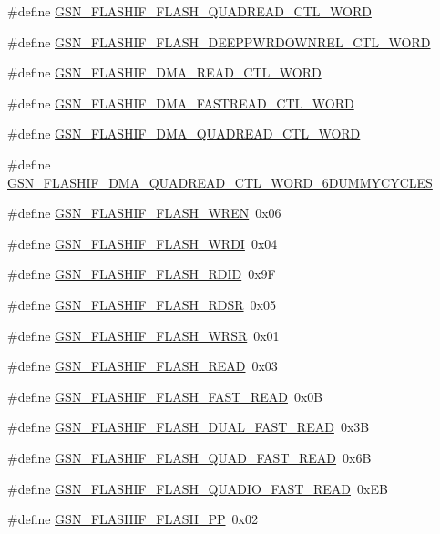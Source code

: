 \begin{DoxyCompactItemize}
\#define \hyperlink{a00501_a1064f47413205b627537f5b62089f921}{GSN\_\-FLASHIF\_\-FLASH\_\-QUADREAD\_\-CTL\_\-WORD}
\item 
\#define \hyperlink{a00501_a82c4245515ddf32d66c496d5c01545c8}{GSN\_\-FLASHIF\_\-FLASH\_\-DEEPPWRDOWNREL\_\-CTL\_\-WORD}
\item 
\#define \hyperlink{a00501_a329a28a5b24cbcebf1677492a510b8a9}{GSN\_\-FLASHIF\_\-DMA\_\-READ\_\-CTL\_\-WORD}
\item 
\#define \hyperlink{a00501_ad74448da0c4a43b719fb51724b212002}{GSN\_\-FLASHIF\_\-DMA\_\-FASTREAD\_\-CTL\_\-WORD}
\item 
\#define \hyperlink{a00501_ae7913b164750c89b5861527237f86968}{GSN\_\-FLASHIF\_\-DMA\_\-QUADREAD\_\-CTL\_\-WORD}
\item 
\#define \hyperlink{a00501_a6b34a4b3658f6bb4275412db19e2f597}{GSN\_\-FLASHIF\_\-DMA\_\-QUADREAD\_\-CTL\_\-WORD\_\-6DUMMYCYCLES}
\item 
\#define \hyperlink{a00501_a34322cbcb7fccb290f6f66cfae69df35}{GSN\_\-FLASHIF\_\-FLASH\_\-WREN}~0x06
\item 
\#define \hyperlink{a00501_ad413125ceeb0878fad9e5436ef6d515e}{GSN\_\-FLASHIF\_\-FLASH\_\-WRDI}~0x04
\item 
\#define \hyperlink{a00501_a97b8d28c1e49792581b7d20cbeb3b9cc}{GSN\_\-FLASHIF\_\-FLASH\_\-RDID}~0x9F
\item 
\#define \hyperlink{a00501_a8cd0d8cabe6736a2e99c2186c853a39f}{GSN\_\-FLASHIF\_\-FLASH\_\-RDSR}~0x05
\item 
\#define \hyperlink{a00501_ab03bcf572199fc61a6f64a7446961708}{GSN\_\-FLASHIF\_\-FLASH\_\-WRSR}~0x01
\item 
\#define \hyperlink{a00501_a79c1ea37a5d7bb3e038e7d67837c64ee}{GSN\_\-FLASHIF\_\-FLASH\_\-READ}~0x03
\item 
\#define \hyperlink{a00501_a17279ad9c99a8da3f12b5db340c8108c}{GSN\_\-FLASHIF\_\-FLASH\_\-FAST\_\-READ}~0x0B
\item 
\#define \hyperlink{a00501_a2a496e4eb4b67f9cc17856bd0d4e2cfe}{GSN\_\-FLASHIF\_\-FLASH\_\-DUAL\_\-FAST\_\-READ}~0x3B
\item 
\#define \hyperlink{a00501_a8b471319c08ce9bd14a9fa69536845e9}{GSN\_\-FLASHIF\_\-FLASH\_\-QUAD\_\-FAST\_\-READ}~0x6B
\item 
\#define \hyperlink{a00501_a7203fc69dc352828cd9c233bfa927790}{GSN\_\-FLASHIF\_\-FLASH\_\-QUADIO\_\-FAST\_\-READ}~0xEB
\item 
\#define \hyperlink{a00501_a1db4dc7ecffb9be35ce103ae53585c45}{GSN\_\-FLASHIF\_\-FLASH\_\-PP}~0x02

\end{DoxyCompactItemize}
